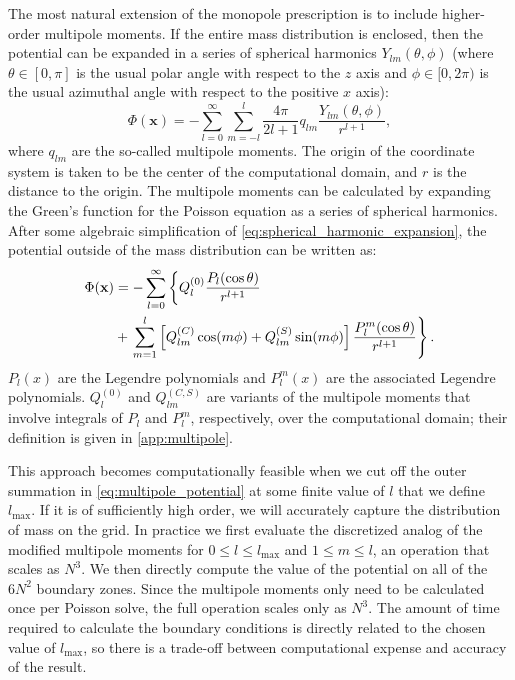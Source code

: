 \documentclass[12pt]{article}
\begin{document}
The most natural extension of the monopole prescription is to include
higher-order multipole moments. If the entire mass distribution is
enclosed, then the potential can be expanded in a series of spherical
harmonics $Y_{lm}(\theta,\phi)$ (where $\theta \in [0, \pi]$ is the usual polar angle
with respect to the $z$ axis and $\phi \in [0, 2\pi)$ is the usual azimuthal angle with
respect to the positive $x$ axis):
\begin{equation}
  \Phi(\mathbf{x}) = -\sum_{l=0}^{\infty}\sum_{m=-l}^{l} \frac{4\pi}{2l + 1} q_{lm} \frac{Y_{lm}(\theta,\phi)}{r^{l+1}}, \label{eq:spherical_harmonic_expansion}
\end{equation}
where $q_{lm}$ are the so-called multipole moments. The origin of the
coordinate system is taken to be the center of the computational
domain, and $r$ is the distance to the origin. The multipole moments
can be calculated by expanding the Green's function for the Poisson
equation as a series of spherical harmonics. After some algebraic
simplification of \autoref{eq:spherical_harmonic_expansion},
the potential outside of the mass distribution can be written as:
\begin{align}
  \Phi(\mathbf{x}) &= -\sum_{l=0}^{\infty} \left\{Q_l^{(0)} \frac{P_l(\text{cos}\, \theta)}{r^{l+1}} \right. \notag \\
    &+ \left. \sum_{m = 1}^{l}\left[ Q_{lm}^{(C)}\, \text{cos}(m\phi) + Q_{lm}^{(S)}\, \text{sin}(m\phi)\right] \frac{P_{l}^{m}(\text{cos}\, \theta)}{r^{l+1}} \right\}.\label{eq:multipole_potential}
\end{align}
$P_l(x)$ are the Legendre polynomials and $P_{l}^{m}(x)$ are the associated Legendre polynomials.
$Q_l^{(0)}$ and $Q_{lm}^{(C,S)}$ are variants of the multipole moments that involve integrals of
$P_l$ and $P_l^m$, respectively, over the computational domain; their definition is given in \autoref{app:multipole}.

This approach becomes computationally feasible when we cut off the
outer summation in \autoref{eq:multipole_potential} at some finite
value of $l$ that we define $l_{\text{max}}$. If it is of sufficiently high order, we
will accurately capture the distribution of mass on the grid. In
practice we first evaluate the discretized analog of the modified
multipole moments for $0 \leq l \leq l_{\text{max}}$ and $1 \leq m
\leq l$, an operation that scales as $N^3$. We then directly compute
the value of the potential on all of the $6N^2$ boundary zones. Since
the multipole moments only need to be calculated once per Poisson
solve, the full operation scales only as $N^3$. The amount of time
required to calculate the boundary conditions is directly related
to the chosen value of $l_{\text{max}}$, so there is a trade-off
between computational expense and accuracy of the result.
\end{document}
